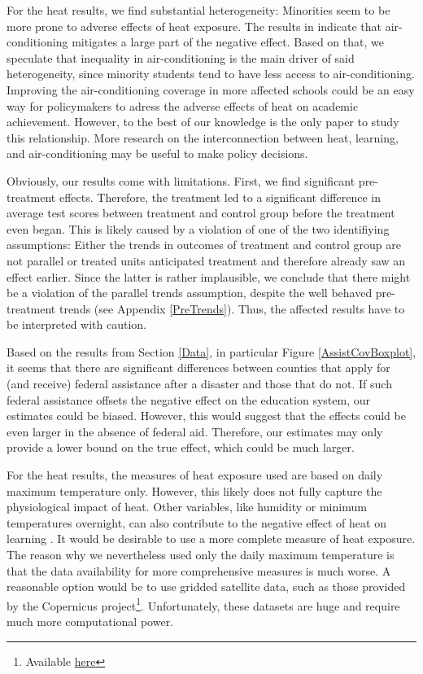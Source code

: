 For the heat results, we find substantial heterogeneity: Minorities seem to be more prone to adverse effects of heat exposure. The results in \cite{Goodman_2020} indicate that air-conditioning mitigates a large part of the negative effect. Based on that, we speculate that inequality in air-conditioning is the main driver of said heterogeneity, since minority students tend to have less access to air-conditioning. Improving the air-conditioning coverage in more affected schools could be an easy way for policymakers to adress the adverse effects of heat on academic achievement. However, to the best of our knowledge \cite{Goodman_2020} is the only paper to study this relationship. More research on the interconnection between heat, learning, and air-conditioning may be useful to make policy decisions.

Obviously, our results come with limitations. First, we find significant pre-treatment effects. Therefore, the treatment led to a significant difference in average test scores between treatment and control group before the treatment even began. This is likely caused by a violation of one of the two identifiying assumptions: Either the trends in outcomes of treatment and control group are not parallel or treated units anticipated treatment and therefore already saw an effect earlier. Since the latter is rather implausible, we conclude that there might be a violation of the parallel trends assumption, despite the well behaved pre-treatment trends (see Appendix \ref{PreTrends}). Thus, the affected results have to be interpreted with caution.

Based on the results from Section \ref{Data}, in particular Figure \ref{AssistCovBoxplot}, it seems that there are significant differences between counties that apply for (and receive) federal assistance after a disaster and those that do not. If such federal assistance offsets the negative effect on the education system, our estimates could be biased. However, this would suggest that the effects could be even larger in the absence of federal aid. Therefore, our estimates may only provide a lower bound on the true effect, which could be much larger.

For the heat results, the measures of heat exposure used are based on daily maximum temperature only. However, this likely does not fully capture the physiological impact of heat. Other variables, like humidity or minimum temperatures overnight, can also contribute to the negative effect of heat on learning \citep[for an extensive discussion of heat exposure measurement see][]{Rennie_2021}. It would be desirable to use a more complete measure of heat exposure. The reason why we nevertheless used only the daily maximum temperature is that the data availability for more comprehensive measures is much worse. A reasonable option would be to use gridded satellite data, such as those provided by the Copernicus project\footnote{Available \href{https://climate.copernicus.eu/}{here}}. Unfortunately, these datasets are huge and require much more computational power.


